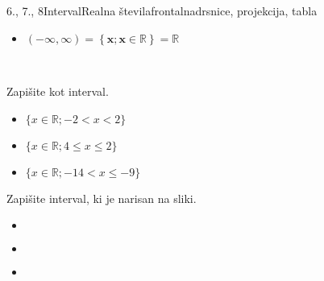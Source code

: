 \begin{priprava}{6., 7., 8}{}{Interval}{Realna števila}{frontalna}{drsnice, projekcija, tabla}
\begin{itemize}
                    \item $ \mathbf{(-\infty,\infty)=\left\{x;x\in\mathbb{R}\right\} =\mathbb{R}}$ \\
                    
                    \begin{figure}[H]
                        \centering
                    \end{figure}

                \end{itemize}

            
            
                ~~~

                \begin{multicols}{2}
        
            \begin{naloga}
                Zapišite kot interval.
                \begin{itemize}
                        \item $\{x\in\mathbb{R}; -2<x<2\}$ 
                        \item $\{x\in\mathbb{R}; 4\leq x\leq 2\}$ 
                        \item $\{x\in\mathbb{R}; -14<x\leq -9\}$ 
                \end{itemize}
            \end{naloga}
        


        
            \begin{naloga}
                Zapišite interval, ki je narisan na sliki.
                \begin{itemize}
                        \item $ $ 
                        \item $ $ 
                        \item $ $ 
                \end{itemize}
            \end{naloga}
        



\end{multicols}
\end{priprava}
